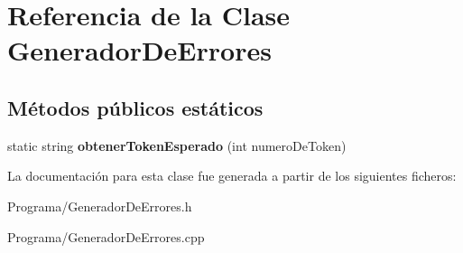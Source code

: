 \hypertarget{class_generador_de_errores}{\section{Referencia de la Clase Generador\-De\-Errores}
\label{class_generador_de_errores}
}
\subsection*{Métodos públicos estáticos}
\begin{DoxyCompactItemize}
\item 
\hypertarget{class_generador_de_errores_a761a25b0838acc443d3d91fbecc46298}{static string {\bfseries obtener\-Token\-Esperado} (int numero\-De\-Token)}\label{class_generador_de_errores_a761a25b0838acc443d3d91fbecc46298}

\end{DoxyCompactItemize}


La documentación para esta clase fue generada a partir de los siguientes ficheros\-:\begin{DoxyCompactItemize}
\item 
Programa/Generador\-De\-Errores.\-h\item 
Programa/Generador\-De\-Errores.\-cpp\end{DoxyCompactItemize}
